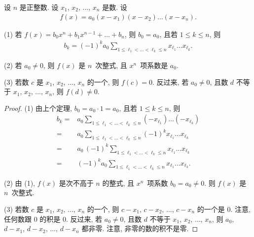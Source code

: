 \documentclass[../libro.tex]{subfiles}
\begin{document}
\begin{theorem}
    设 \(n\) 是正整数.
    设 \(x_1\), \(x_2\), \(\dots\), \(x_n\) 是数.
    设
    \begin{align*}
        f(x) = a_0 (x - x_1) (x - x_2) \dots (x - x_n).
    \end{align*}

    (1)
    若 \(f(x) = b_0 x^n + b_1 x^{n-1} + \dots + b_n\),
    则 \(b_0 = a_0\), 且若 \(1 \leq k \leq n\), 则
    \begin{align*}
        b_k = (-1)^k a_0 \sum_{1 \leq \ell_1 < \dots < \ell_k \leq n}
        {x_{\ell_1} \dots x_{\ell_k}}.
    \end{align*}

    (2)
    若 \(a_0 \neq 0\), 则 \(f(x)\) 是 \(n\)~次整式,
    且 \(x^n\)~项系数是 \(a_0\).

    (3)
    若数 \(c\) 是 \(x_1\), \(x_2\), \(\dots\), \(x_n\) 的一个,
    则 \(f(c) = 0\).
    反过来, 若 \(a_0 \neq 0\),
    且数 \(d\) 不等于 \(x_1\), \(x_2\), \(\dots\), \(x_n\),
    则 \(f(d) \neq 0\).
\end{theorem}

\begin{proof}
    (1)
    由上个定理, \(b_0 = a_0 \cdot 1 = a_0\),
    且若 \(1 \leq k \leq n\), 则
    \begin{align*}
        b_k
        = {} &
        a_0
        \sum_{1 \leq \ell_1 < \dots < \ell_k \leq n}
        {(-x_{\ell_1}) \dots (-x_{\ell_k})}
        \\
        = {} &
        a_0
        \sum_{1 \leq \ell_1 < \dots < \ell_k \leq n}
        {(-1)^k x_{\ell_1} \dots x_{\ell_k}}
        \\
        = {} &
        a_0\, (-1)^k
        \sum_{1 \leq \ell_1 < \dots < \ell_k \leq n}
        {x_{\ell_1} \dots x_{\ell_k}}
        \\
        = {} &
        (-1)^k a_0
        \sum_{1 \leq \ell_1 < \dots < \ell_k \leq n}
        {x_{\ell_1} \dots x_{\ell_k}}.
    \end{align*}

    (2)
    由 (1), \(f(x)\) 是次不高于 \(n\) 的整式,
    且 \(x^n\)~项系数 \(b_0 = a_0 \neq 0\).
    则 \(f(x)\) 是 \(n\)~次整式.

    (3)
    若数 \(c\) 是 \(x_1\), \(x_2\), \(\dots\), \(x_n\) 的一个,
    则 \(c - x_1\), \(c - x_2\), \(\dots\), \(c - x_n\) 的一个是 \(0\).
    注意, 任何数跟 \(0\) 的积是 \(0\).
    反过来, 若 \(a_0 \neq 0\),
    且数 \(d\) 不等于 \(x_1\), \(x_2\), \(\dots\), \(x_n\),
    则 \(a_0\), \(d - x_1\), \(d - x_2\), \(\dots\), \(d - x_n\)
    都非零.
    注意, 非零的数的积不是零.
\end{proof}
\end{document}
